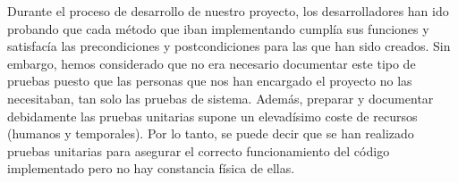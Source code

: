 


Durante el proceso de desarrollo de nuestro proyecto, los desarrolladores han ido probando que cada método que iban
implementando cumplía sus funciones y satisfacía las precondiciones y postcondiciones para las que han sido creados.
Sin embargo, hemos considerado que no era necesario documentar este tipo de pruebas puesto que las personas que nos 
han encargado el proyecto no las necesitaban, tan solo las pruebas de sistema. Además, preparar y documentar debidamente
las pruebas unitarias supone un elevadísimo coste de recursos (humanos y temporales). Por lo tanto, se puede decir que se han realizado pruebas unitarias para asegurar el correcto funcionamiento del código implementado pero no hay constancia física de ellas.

